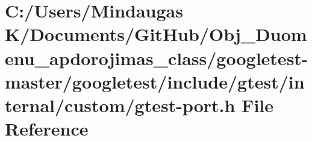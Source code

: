 \hypertarget{googletest-master_2googletest_2include_2gtest_2internal_2custom_2gtest-port_8h}{}\section{C\+:/\+Users/\+Mindaugas K/\+Documents/\+Git\+Hub/\+Obj\+\_\+\+Duomenu\+\_\+apdorojimas\+\_\+class/googletest-\/master/googletest/include/gtest/internal/custom/gtest-\/port.h File Reference}
\label{googletest-master_2googletest_2include_2gtest_2internal_2custom_2gtest-port_8h}

